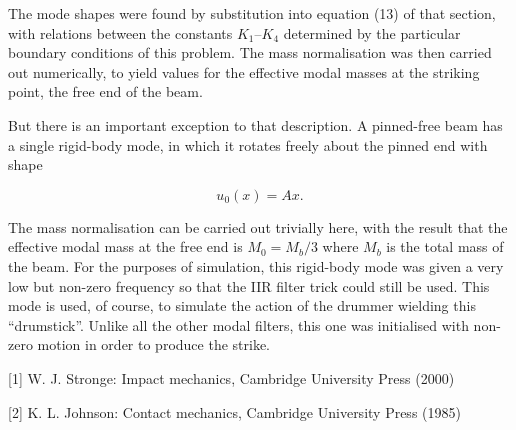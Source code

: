   The mode shapes were found by substitution into equation (13) of that 
  section, with relations between the constants $K_1$--$K_4$ determined by the 
  particular boundary conditions of this problem. The mass normalisation was 
  then carried out numerically, to yield values for the effective modal masses 
  at the striking point, the free end of the beam. 

  But there is an important exception to that description. A pinned-free beam 
  has a single rigid-body mode, in which it rotates freely about the pinned end 
  with shape 

  \begin{equation*}u_0(x)=A x . \tag{12}\end{equation*} 

  The mass normalisation can be carried out trivially here, with the result 
  that the effective modal mass at the free end is $M_0=M_b/3$ where $M_b$ is 
  the total mass of the beam. For the purposes of simulation, this rigid-body 
  mode was given a very low but non-zero frequency so that the IIR filter trick 
  could still be used. This mode is used, of course, to simulate the action of 
  the drummer wielding this ``drumstick''. Unlike all the other modal filters, 
  this one was initialised with non-zero motion in order to produce the strike. 

  \sectionreferences{}[1] W. J. Stronge: Impact mechanics, Cambridge University 
  Press (2000) 

  [2] K. L. Johnson: Contact mechanics, Cambridge University Press (1985) 
